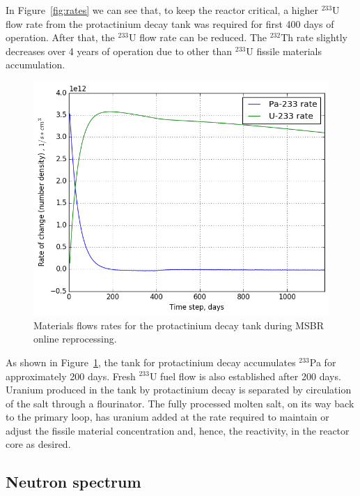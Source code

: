 \documentclass{anstrans}
\begin{document}
In Figure~\ref{fig:rates} we can see that, to keep the reactor critical, a higher $^{233}$U 
flow rate from the protactinium decay tank was required for first 400 days of 
operation. After that, the $^{233}$U flow rate can be reduced. The $^{232}$Th 
rate slightly decreases over 4 years of operation due to other than $^{233}$U 
fissile materials accumulation.

\begin{figure}[htbp!] %
        \centering
        \includegraphics[width=1.03\linewidth]{rates_outflow.png}
        \caption{Materials flows rates for the protactinium decay tank during 
        \gls{MSBR} online reprocessing.}
        \label{fig:outflow}
\end{figure}
As shown in Figure~\ref{fig:outflow}, the tank for protactinium decay 
accumulates $^{233}$Pa for approximately 200 days. Fresh $^{233}$U fuel flow is 
also established after 200 days. Uranium produced in the tank by protactinium 
decay is separated by circulation of the salt through a flourinator. The fully 
processed molten salt, on its way back to the primary loop, has uranium added 
at the rate required to maintain or adjust the fissile material concentration 
and, hence, the reactivity, in the reactor core as desired.

\subsection{Neutron spectrum}
\end{document}
